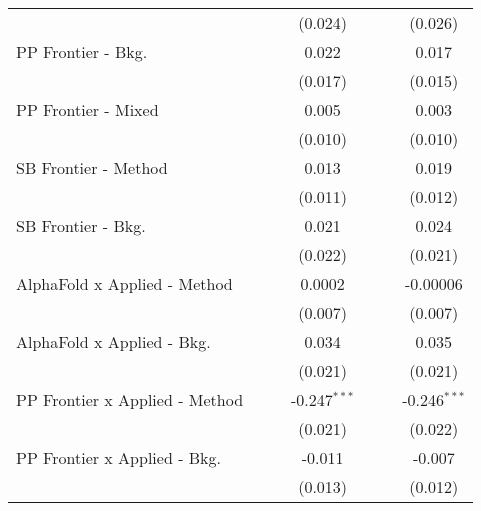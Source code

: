 \begin{tabular}{lcccccc}
                                  &                &         & (0.024)        &                &         & (0.026)\\   
   PP Frontier - Bkg.             &                &         & 0.022          &                &         & 0.017\\   
                                  &                &         & (0.017)        &                &         & (0.015)\\   
   PP Frontier - Mixed            &                &         & 0.005          &                &         & 0.003\\   
                                  &                &         & (0.010)        &                &         & (0.010)\\   
   SB Frontier - Method           &                &         & 0.013          &                &         & 0.019\\   
                                  &                &         & (0.011)        &                &         & (0.012)\\   
   SB Frontier - Bkg.             &                &         & 0.021          &                &         & 0.024\\   
                                  &                &         & (0.022)        &                &         & (0.021)\\   
   AlphaFold x Applied - Method   &                &         & 0.0002         &                &         & -0.00006\\   
                                  &                &         & (0.007)        &                &         & (0.007)\\   
   AlphaFold x Applied - Bkg.     &                &         & 0.034          &                &         & 0.035\\   
                                  &                &         & (0.021)        &                &         & (0.021)\\   
   PP Frontier x Applied - Method &                &         & -0.247$^{***}$ &                &         & -0.246$^{***}$\\   
                                  &                &         & (0.021)        &                &         & (0.022)\\   
   PP Frontier x Applied - Bkg.   &                &         & -0.011         &                &         & -0.007\\   
                                  &                &         & (0.013)        &                &         & (0.012)\\   

\end{tabular}
